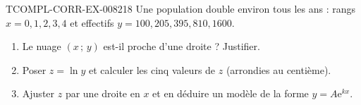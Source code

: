 \begin{exercice}{TCOMPL-CORR-EX-008}{2}{18}
Une population double environ tous les ans : rangs $x=0,1,2,3,4$ et effectifs
$y=100,205,395,810,1600$.
\begin{enumerate}
  \item Le nuage $(x\,;\,y)$ est-il proche d'une droite ? Justifier.
  \item Poser $z=\ln y$ et calculer les cinq valeurs de $z$ (arrondies au
        centième).
  \item Ajuster $z$ par une droite en $x$ et en déduire un modèle de la forme
        $y=A\mathrm{e}^{kx}$.
\end{enumerate}
\end{exercice}
